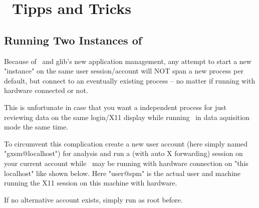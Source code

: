 
\chapter{\Gxsm\ Tipps and Tricks}
\label{cha:Gxsm-hacks}
\section{Running Two Instances of \Gxsm\ }
Because of \Gxsm\ and glib's new application management, any attempt to start a new "instance" on the same user session/account will NOT span a new process per default, but connect to an eventually existing \Gxsm process -- no matter if running with hardware connected or not.

This is unfortunate in case that you want a independent process for just reviewing data on the same login/X11 display while running \Gxsm\ in data aquisition mode the same time.

To circumvent this complication create a new user account (here simply named "gxsm@localhost") for analysis and run a  (with auto X forwarding) session on your current account while \Gxsm\ may be running with hardware connection on "this localhost" like shown below. Here "user@spm" is the actual user and machine running the X11 session on this machine with hardware.

If no alternative account exists, simply run as root  before.

